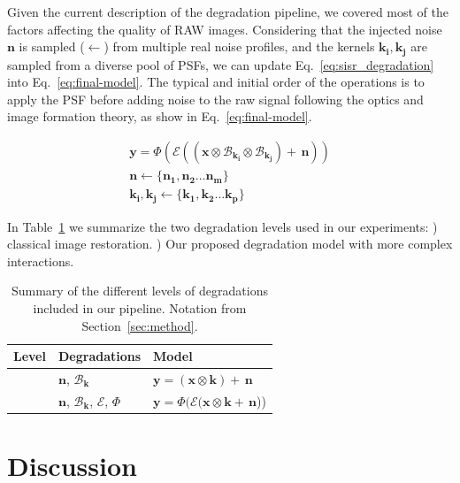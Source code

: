 \documentclass{article}
\newcommand{\RNum}[1]{\uppercase\expandafter{\romannumeral #1\relax}}
\begin{document}
Given the current description of the degradation pipeline, we covered most of the factors affecting the quality of RAW images. Considering that the injected noise $\mathbf{n}$ is sampled ($\leftarrow$) from multiple real noise profiles, and the kernels $\mathbf{k_i}, \mathbf{k_j}$ are sampled from a diverse pool of PSFs, we can update Eq.~\ref{eq:sisr_degradation} into Eq.~\ref{eq:final-model}. 
The typical and initial order of the operations is to apply the PSF before adding noise to the raw signal following the optics and image formation theory, as show in Eq.~\ref{eq:final-model}.


\begin{align}\label{eq:final-model}
\mathbf{y}\! = \!\Phi(\mathcal{E}((\mathbf{x} \otimes \mathcal{B}_\mathbf{k_i} \otimes \mathcal{B}_\mathbf{k_j}) + \,\mathbf{n} )) \\
\mathbf{n} \leftarrow \{\mathbf{n_1}, \mathbf{n_2} \dots \mathbf{n_m}\}\nonumber\\
\mathbf{k_i}, \mathbf{k_j} \leftarrow \{\mathbf{k_1}, \mathbf{k_2} \dots \mathbf{k_p}\} \nonumber
\end{align}

In Table~\ref{tab:deg} we summarize the two degradation levels used in our experiments: \RNum{1}) classical image restoration. \RNum{2}) Our proposed degradation model with more complex interactions.

\begin{table}[]
    \centering
    \begin{tabular}{c l l}
         \toprule
         Level & Degradations & Model \\
         \midrule
         \RNum{1} & $\mathbf{n}$, $\mathcal{B}_\mathbf{k}$ & $\mathbf{y} = \!(\mathbf{x}\otimes \mathbf{k}) + \,\mathbf{n}$ \\
         \RNum{2} & $\mathbf{n}$, $\mathcal{B}_\mathbf{k}$, $\mathcal{E}$, $\Phi$ & $\mathbf{y} = \!\Phi(\mathcal{E}(\mathbf{x}\otimes \mathbf{k} + \,\mathbf{n}$))  \\
         \bottomrule
    \end{tabular}
    \caption{Summary of the different levels of degradations included in our pipeline. Notation from Section~\ref{sec:method}.
    }
    \label{tab:deg}
\end{table}

\section{Discussion}
\label{sec:discussion}
\end{document}
